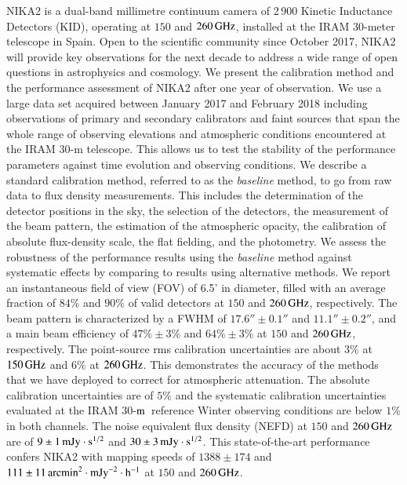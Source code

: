 \documentclass[traditionalabstract]{aa}
\newcommand{\trentemetre}{30-$\rm{m}$}
\newcommand{\lp}[1]{#1}
\newcommand{\rev}[1]{#1}
\begin{document}
       {
         NIKA2 is a dual-band millimetre continuum
         camera of 2\,900 Kinetic Inductance Detectors (KID),
         operating at $150$ and $260\,\rm{GHz}$, installed at the IRAM 30-meter
         telescope %
          in Spain.
         Open to the scientific community since October 2017, NIKA2 
         will provide key observations for the next decade to 
         address a wide range of open questions in astrophysics and
         cosmology.}
       {We present {\lp the calibration method} and the performance assessment of NIKA2 after one year of observation.}
       {We use a large data set acquired between January 2017 and
         February 2018 including observations of primary and secondary
         calibrators and faint sources that span the whole range
         of observing elevations and atmospheric conditions encountered at the
         IRAM 30-m telescope. This allows us to test the stability of the
         performance parameters against time evolution and
         observing conditions. {\lp We describe a standard calibration
         method, referred to as the \emph{baseline} method, to go from
         raw data to flux density measurements. This includes the
         determination of the detector positions in the sky, the
         selection of the detectors, the measurement of
         the beam pattern, the estimation of the 
         atmospheric opacity, the calibration of absolute flux-density
         scale, the flat fielding, and the photometry. We
         assess the robustness of the performance results using the
         \emph{baseline} method against systematic effects by
         comparing to results using alternative methods.}  
       }
       {We report an instantaneous field of view (FOV) of 6.5'
         in diameter, filled with an average fraction of $84\%$ and 
         $90\%$ of %
         valid detectors
         at $150$ and $260\,\rm{GHz}$, respectively. The beam pattern
         is characterized by a FWHM of $17.6'' \pm 0.1''$
         and  $11.1''\pm 0.2''$, and a main beam efficiency of
         {\rev $47\% \pm 3\%$} and {\rev $64\% \pm 3\%$}
         at $150$ and $260\,\rm{GHz}$, respectively.
         The {\rev point-source} rms calibration uncertainties are about $3\%$ at $150\,\rm{GHz}$ 
         and $6\%$ at $260\,\rm{GHz}$. This demonstrates
         the accuracy of the methods that we have deployed to correct
         for atmospheric attenuation.
         {\lp The absolute
           calibration uncertainties are of $5\%$ and the systematic
           calibration uncertainties evaluated at the IRAM
           \trentemetre\ reference Winter observing conditions are
           below $1\%$ in both channels.}
         The noise equivalent
         flux density (NEFD) at $150$ and $260\,\rm{GHz}$ are of
         $9 \pm 1\, \rm{mJy}\cdot s^{1/2}$ and
         $30 \pm 3\, \rm{mJy}\cdot s^{1/2}$. 
         This state-of-the-art performance confers NIKA2 with
         mapping speeds of $1388 \pm 174$ and
         $111 \pm 11 \, \rm{arcmin}^2\cdot \rm{mJy}^{-2}\cdot
         \rm{h}^{-1}$
         at $150$ and $260\,\rm{GHz}$.}
\end{document}
